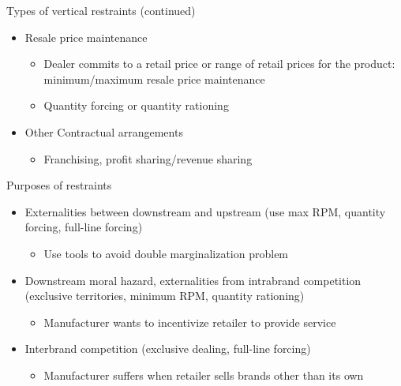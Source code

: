 \documentclass[notes=show]{beamer}
\begin{document}
\begin{frame}
Types of vertical restraints (continued)

\begin{itemize}
\item Resale price maintenance

\begin{itemize}
\item Dealer commits to a retail price or range of retail prices for the
product: minimum/maximum resale price maintenance

\item Quantity forcing or quantity rationing
\end{itemize}

\item Other Contractual arrangements

\begin{itemize}
\item Franchising, profit sharing/revenue sharing
\end{itemize}
\end{itemize}
\end{frame}


\begin{frame}
Purposes of restraints

\begin{itemize}
\item Externalities between downstream and upstream (use max RPM, quantity
forcing, full-line forcing)

\begin{itemize}
\item Use tools to avoid double marginalization problem
\end{itemize}

\item Downstream moral hazard, externalities from intrabrand competition
(exclusive territories, minimum RPM, quantity rationing)

\begin{itemize}
\item Manufacturer wants to incentivize retailer to provide service
\end{itemize}

\item Interbrand competition (exclusive dealing, full-line forcing)

\begin{itemize}
\item Manufacturer suffers when retailer sells brands other than its own
\end{itemize}
\end{itemize}
\end{frame}
\end{document}
